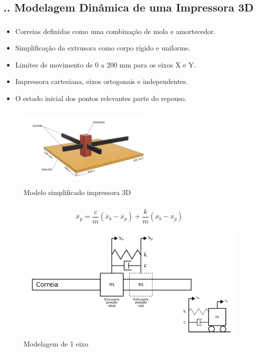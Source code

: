 \documentclass[aspectratio=169]{beamer}
\begin{document}
\subsection{\insertsectionnumber .\insertsubsectionnumber . Modelagem Dinâmica de uma Impressora 3D}

\begin{frame}
  \frametitle{\insertsubsection}
  \begin{itemize}
    \item Correias definidas como uma combinação de mola e amortecedor.
    \item Simplificação da extrusora como corpo rígido e uniforme.
    \item Limites de movimento de 0 a 200 mm para os eixos X e Y.
    \item Impressora cartesiana, eixos ortogonais e independentes.
    \item O estado inicial dos pontos relevantes parte do repouso.
\end{itemize}
\end{frame}

\begin{frame}
  \frametitle{\insertsubsection}
  \begin{figure}[H]
    \centering
    \caption{Modelo simplificado impressora 3D}
    \includegraphics[width=0.6\textwidth]{simple_model}
    \label{fig:simple_model}
  \end{figure}
\end{frame}

\begin{frame}
  \frametitle{\insertsubsection}
  \begin{equation}
    \label{eq:mov_impressora_2}
    \ddot{x_p} = \frac{c}{m}(\dot{x_b} - \dot{x_p}) + \frac{k}{m}(x_b - x_p) 
  \end{equation}
  \begin{figure}[H]
    \centering
    \caption{Modelagem de 1 eixo}
    \includegraphics[width=.7\textwidth]{model_1_axis}

    \label{fig:model_1_axis}
  \end{figure}
\end{frame}
\end{document}
